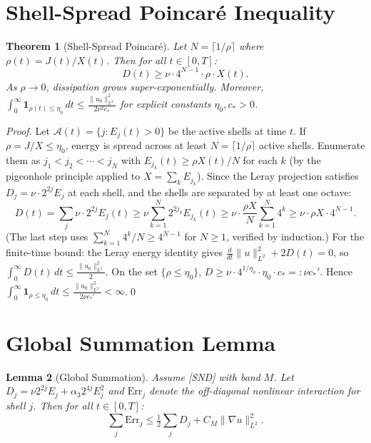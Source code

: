 \documentclass[11pt]{article}
\newtheorem{theorem}{Theorem}[section]
\newtheorem{lemma}[theorem]{Lemma}
\begin{document}
\section{Shell-Spread Poincar\'e Inequality}

\begin{theorem}[Shell-Spread Poincar\'e]\label{thm:poincare}
Let $N = \lceil 1/\rho\rceil$ where $\rho(t) = J(t)/X(t)$.
Then for all $t\in[0,T]$:
\[
D(t) \geq \nu\cdot 4^{N-1}\cdot\rho\cdot X(t).
\]
As $\rho\to 0$, dissipation grows super-exponentially.
Moreover, $\int_0^\infty \mathbf{1}_{\rho(t)\leq\eta_0}\,dt \leq \frac{\|u_0\|^2_{L^2}}{2\nu^2 c_*}$
for explicit constants $\eta_0, c_* > 0$.
\end{theorem}

\begin{proof}
Let $\mathcal{A}(t) = \{j : E_j(t) > 0\}$ be the active shells at time $t$.
If $\rho = J/X \leq \eta_0$, energy is spread across at least $N = \lceil 1/\rho\rceil$
active shells. Enumerate them as $j_1 < j_2 < \cdots < j_N$ with
$E_{j_k}(t) \geq \rho X(t)/N$ for each $k$ (by the pigeonhole principle applied to
$X = \sum_k E_{j_k}$). Since the Leray projection satisfies $D_j = \nu\cdot 2^{2j} E_j$
at each shell, and the shells are separated by at least one octave:
\[
D(t) = \sum_j \nu\cdot 2^{2j} E_j(t)
\geq \nu \sum_{k=1}^N 2^{2j_k} E_{j_k}(t)
\geq \nu\cdot\frac{\rho X}{N}\sum_{k=1}^N 4^k
\geq \nu\cdot\rho X\cdot 4^{N-1}.
\]
(The last step uses $\sum_{k=1}^N 4^k/N \geq 4^{N-1}$ for $N \geq 1$, verified by induction.)
For the finite-time bound: the Leray energy identity gives
$\frac{d}{dt}\|u\|^2_{L^2} + 2D(t) = 0$, so
$\int_0^\infty D(t)\,dt \leq \frac{\|u_0\|^2_{L^2}}{2}$.
On the set $\{\rho \leq \eta_0\}$, $D \geq \nu\cdot 4^{1/\eta_0}\cdot\eta_0\cdot c_* =: \nu c_*'$.
Hence $\int_0^\infty \mathbf{1}_{\rho\leq\eta_0}\,dt \leq \frac{\|u_0\|^2_{L^2}}{2\nu c_*'} < \infty$.\qed
\end{proof}

\section{Global Summation Lemma}

\begin{lemma}[Global Summation]\label{lem:gsl}
Assume [SND] with band $M$. Let $D_j = \nu 2^{2j}E_j + \alpha_3 2^{4j}E_j^2$
and $\mathrm{Err}_j$ denote the off-diagonal nonlinear interaction for shell $j$.
Then for all $t\in[0,T]$:
\[
\sum_j \mathrm{Err}_j \leq \tfrac{1}{2}\sum_j D_j + C_M\|\nabla u\|^2_{L^2}.
\]
\end{lemma}
\end{document}
